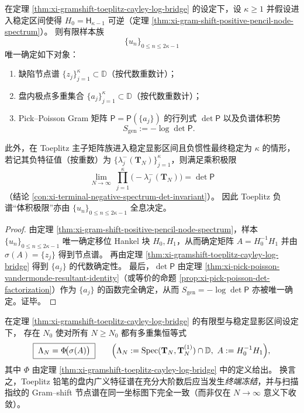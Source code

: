 \begin{theorem}\label{thm:xi-2k-sample-holography-reconstructs-detP}
在定理 \ref{thm:xi-gramshift-toeplitz-cayley-log-bridge} 的设定下，设 \(\kappa\ge 1\) 并假设进入稳定区间使得 \(H_0=\mathsf H_{\kappa-1}\) 可逆（定理 \ref{thm:xi-gram-shift-positive-pencil-node-spectrum}）。
则有限样本族
\[
\{u_n\}_{0\le n\le 2\kappa-1}
\]
唯一确定如下对象：
\begin{enumerate}
\normalfont
  \item 缺陷节点谱 \(\{z_j\}_{j=1}^{\kappa}\subset\mathbb{D}\)（按代数重数计）；
  \item 盘内极点多重集合 \(\{a_j\}_{j=1}^{\kappa}\subset\mathbb{D}\)（按代数重数计）；
  \item Pick--Poisson Gram 矩阵 \(\mathsf P=\mathsf P(\{a_j\})\) 的行列式 \(\det\mathsf P\) 以及负谱体积势
  \[
  S_{\mathrm{gen}}:=-\log\det\mathsf P.
  \]
\end{enumerate}
此外，在 Toeplitz 主子矩阵族进入稳定显影区间且负惯性最终稳定为 \(\kappa\) 的情形，若记其负特征值（按重数）为 \(\{\lambda_j^{-}(\mathbf{T}_N)\}_{j=1}^{\kappa}\)，则满足乘积极限
\[
\lim_{N\to\infty}\ \prod_{j=1}^{\kappa}\bigl(-\lambda_j^{-}(\mathbf{T}_N)\bigr)=\det\mathsf P
\]
（结论 \ref{con:xi-terminal-negative-spectrum-det-invariant}）。
因此 Toeplitz 负谱“体积极限”亦由 \(\{u_n\}_{0\le n\le 2\kappa-1}\) 全息决定。
\end{theorem}
\begin{proof}
由定理 \ref{thm:xi-gram-shift-positive-pencil-node-spectrum}，样本 \(\{u_n\}_{0\le n\le 2\kappa-1}\) 唯一确定移位 Hankel 块 \(H_0,H_1\)，从而确定矩阵 \(A=H_0^{-1}H_1\) 并由 \(\sigma(A)=\{z_j\}\) 得到节点谱。
再由定理 \ref{thm:xi-gramshift-toeplitz-cayley-log-bridge} 得到 \(\{a_j\}\) 的代数确定性。
最后，\(\det\mathsf P\) 由定理 \ref{thm:xi-pick-poisson-vandermonde-resultant-identity}（或等价的命题 \ref{prop:xi-pick-poisson-det-factorization}）作为 \(\{a_j\}\) 的函数完全确定，从而 \(S_{\mathrm{gen}}=-\log\det\mathsf P\) 亦被唯一确定。证毕。
\end{proof}

\begin{conjecture}\label{conj:xi-toeplitz-gramshift-finite-order-spectral-rigidity}
在定理 \ref{thm:xi-gramshift-toeplitz-cayley-log-bridge} 的有限型与稳定显影区间设定下，
存在 \(N_0\) 使对所有 \(N\ge N_0\) 都有多重集恒等式
\[
\boxed{\;
\Lambda_N=\Phi\!\bigl(\sigma(A)\bigr)\;}
\qquad
\Bigl(
\Lambda_N:=\mathrm{Spec}(\mathbf{T}_N,\mathbf{T}_N^{(1)})\cap\mathbb{D},\ 
A:=H_0^{-1}H_1
\Bigr),
\]
其中 \(\Phi\) 由定理 \ref{thm:xi-gramshift-toeplitz-cayley-log-bridge} 中的定义给出。
换言之，Toeplitz 铅笔的盘内广义特征谱在充分大阶数后应当发生\emph{终端冻结}，并与扫描指纹的 Gram--shift 节点谱在同一坐标图下完全一致（而非仅在 \(N\to\infty\) 意义下收敛）。
\end{conjecture}

